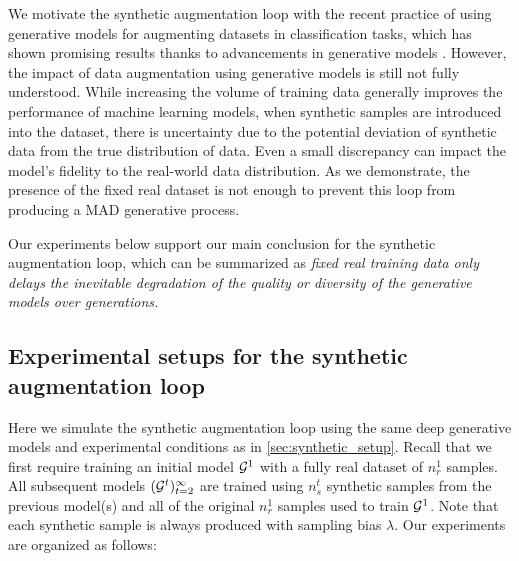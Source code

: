 \documentclass{article}
\def\bias{{\lambda}}
\def\colorMixed{colorB}
\def\mixed{\textcolor{\colorMixed}{synthetic augmentation loop}}
\begin{document}
We motivate the \mixed{} with the recent practice of using generative models for augmenting datasets in classification tasks, which has shown promising results
thanks to advancements in generative models
\cite{burg2023data, boomerang}. 
However, the impact of data augmentation using generative models is still not fully understood. While increasing the volume of training data generally improves the performance of machine learning models,
when synthetic samples are introduced into the dataset, there is uncertainty due to the  potential deviation of synthetic data from the true distribution of data. Even a small discrepancy can impact the model's fidelity to the real-world data distribution. As we demonstrate, the presence of the fixed real dataset is not enough to prevent this loop from producing a MAD generative process.

Our experiments below support our main conclusion for the \mixed{}, which can be summarized as {\em fixed real training data only delays the inevitable degradation of the quality or diversity of the generative models over generations.}


\subsection{Experimental setups for the \mixed{}}

Here we simulate the \mixed{} using the same deep generative models and experimental conditions as in \cref{sec:synthetic_setup}. Recall that we first require training an initial model $\mathcal{G}^1$ with a fully real dataset of $n_r^1$ samples. All subsequent models $(\mathcal{G}^t)_{t=2}^\infty$ are trained using $n_s^t$ synthetic samples from the previous model(s) and all of the original $n_r^1$ samples used to train $\mathcal{G}^1$. Note that each synthetic sample is always produced with sampling bias $\bias$. Our experiments are organized as follows:
\end{document}
